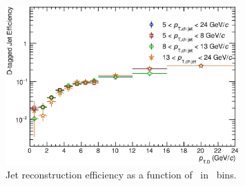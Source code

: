 \begin{figure}[tbh]
\begin{center}
\includegraphics[width=0.8\textwidth]{img/HQ16_Simulation_EfficiencyVsDPt_LogScale}
 \caption{Jet reconstruction efficiency as a function of \ptd\ in \ptchjet\ bins.} 
 \label{fig:HQ16_Simulation_EfficiencyVsDPt_LogScale}
\end{center}
\end{figure}

